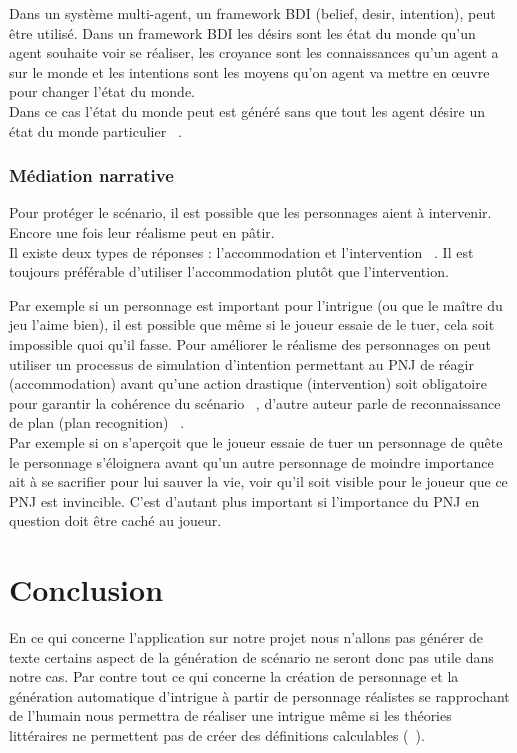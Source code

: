 \documentclass[asi]{picINSA}
\begin{document}
Dans un système multi-agent, un framework BDI (belief, desir, intention), peut être utilisé. Dans un framework BDI les désirs sont les état du monde qu'un agent souhaite voir se réaliser, les croyance sont les connaissances qu'un agent a sur le monde et les intentions sont les moyens qu'on agent va mettre en œuvre pour changer l'état du monde. \\

Dans ce cas l'état du monde peut est généré sans que tout les agent désire un état du monde particulier ~\cite{riedl2004intent}.

\subsection{Médiation narrative}

Pour protéger le scénario, il est possible que les personnages aient à intervenir. Encore une fois leur réalisme peut en pâtir. \\

Il existe deux types de réponses : l’accommodation et l'intervention ~\cite{riedl2003managing}.
Il est toujours préférable d'utiliser l’accommodation plutôt que l'intervention.

Par exemple si un personnage est important pour l'intrigue (ou que le maître du jeu l'aime bien),
il est possible que même si le joueur essaie de le tuer, cela soit impossible quoi qu'il fasse.
Pour améliorer le réalisme des personnages on peut utiliser un processus de simulation d'intention
permettant au PNJ de réagir (accommodation)
avant qu'une action drastique (intervention) soit obligatoire pour garantir la cohérence du
scénario ~\cite{Ciarlini:2010:ERP:1658866.1658874}, d'autre auteur parle de reconnaissance de plan (plan recognition) ~\cite{riedl2003managing}. \\

Par exemple si on s'aperçoit que le joueur essaie de tuer un personnage de quête le personnage s'éloignera avant qu'un autre
personnage de moindre importance ait à se sacrifier pour lui sauver la vie, voir qu'il soit visible pour le joueur que ce PNJ est invincible. C'est d'autant plus important si l'importance du PNJ en question doit être caché au joueur. \\

\chapter*{Conclusion}

En ce qui concerne l'application sur notre projet nous n'allons pas générer de texte certains aspect de la génération de
scénario ne seront donc pas utile dans notre cas. Par contre tout ce qui concerne la création de personnage et la
 génération automatique d'intrigue à partir de personnage réalistes se rapprochant de l'humain nous permettra de
  réaliser une intrigue même si les théories littéraires ne permettent pas de créer des définitions calculables (~\cite{Callaway2002213}). \\
\end{document}
